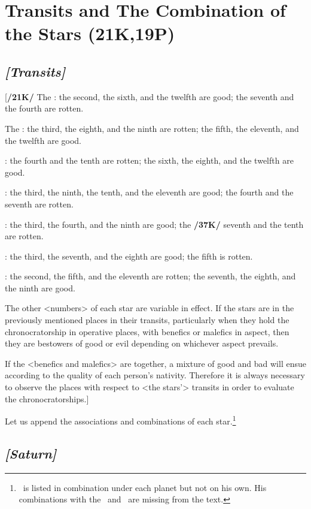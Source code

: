 \section{Transits and The Combination of the Stars (21K,19P)}

\subsection{\textit{[Transits]}}
[\textbf{/21K/}
The \Sun: the second, the sixth, and the twelfth are good; the seventh and the fourth are rotten.

The \Moon: the third, the eighth, and the ninth are rotten; the fifth, the eleventh, and the twelfth are good.

\Saturn: the fourth and the tenth are rotten; the sixth, the eighth, and the twelfth are good.

\Jupiter: the third, the ninth, the tenth, and the eleventh are good; the fourth and the seventh are rotten.

\Mars: the third, the fourth, and the ninth are good; the \textbf{/37K/} seventh and the tenth are rotten.

\Venus: the third, the seventh, and the eighth are good; the fifth is rotten.

\Mercury: the second, the fifth, and the eleventh are rotten; the seventh, the eighth, and the ninth are good.

\mndl[0.2cm]
The other <numbers> of each star are variable in effect.
If the stars are in the previously mentioned places in their transits, particularly when they hold the chronocratorship in operative places, with benefics or malefics in aspect, then they are bestowers of good or evil depending on whichever aspect prevails. 

\mnm[0.3cm]
If the <benefics and malefics> are together, a mixture of good and bad will ensue according to the quality of each person’s nativity. Therefore it is always necessary to
observe the places with respect to <the stars’> transits in order to evaluate the chronocratorships.]

Let us append the associations and combinations of each star.\enlargethispage{2\baselineskip}\footnote{\Mars\, is listed in combination under each planet but not on his own. His combinations with the \Sun\, and \Moon\, are missing from the text.}



\secbr
{}
\subsection{\textit{[Saturn]}}

